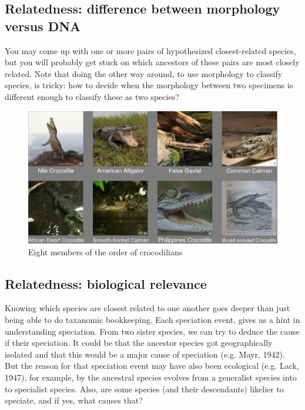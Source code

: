 \subsection{Relatedness: difference between morphology versus DNA}

You may come up with one or more pairs of hypothesized closest-related species,
but you will probably get stuck on which ancestors of these pairs
are most closely related. Note that doing the other way around, to use
morphology to classify species, is tricky: how to decide when the morphology 
between two specimens is different enough to classify these as two species?

\begin{figure}[H]
  \includegraphics[width=1.0\textwidth]{crocodilians.png}
  \caption{
    Eight members of the order of crocodilians
  }
  \label{fig:crocodialians}
\end{figure}

\subsection{Relatedness: biological relevance}

Knowing which species are closest related to
one another goes deeper than just
being able to do taxanomic bookkeeping. Each
speciation event, gives us a hint in understanding speciation.
From two sister species, we can try to deduce the cause
if their speciation. It could be that the ancestor species
got geographically isolated and that this would be a major
cause of speciation (e.g. Mayr, 1942). But the reason for
that speciation event may have also been ecological (e.g. Lack, 1947),
for example, by the ancestral species evolves from a generalist
species into to specialist species. Also, are some species (and their
descendants) likelier to speciate, and if yes, what causes that?

